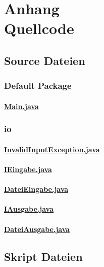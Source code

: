 \addtocounter{chapter}{1}
\chapter*{Anhang \thechapter\\[1.2cm] Quellcode}
\label{Quellcode}
\section{Source Dateien}
\subsection{Default Package}
\subsubsection{\underline{Main.java}}

\clearpage
%
\subsection{io}
\subsubsection{\underline{InvalidInputException.java}}

\clearpage
%
\subsubsection{\underline{IEingabe.java}}

\clearpage
%
\subsubsection{\underline{DateiEingabe.java}}

\clearpage
%
\subsubsection{\underline{IAusgabe.java}}

\clearpage
%
\subsubsection{\underline{DateiAusgabe.java}}

\clearpage
%
\section{Skript Dateien}


\cleardoublepage